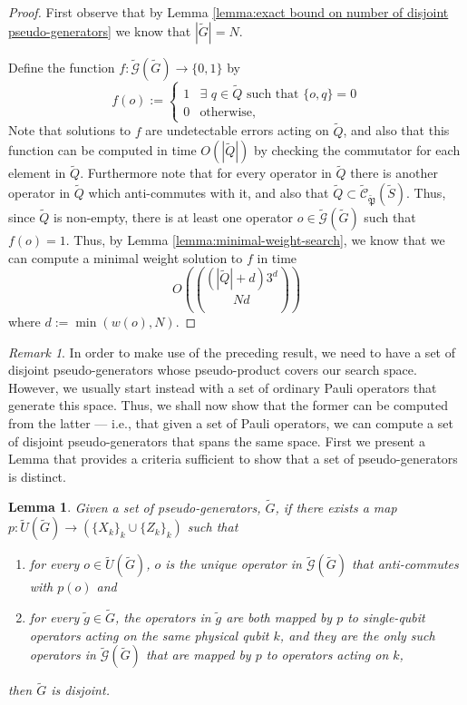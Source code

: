\documentclass[12pt]{amsbook}
\theoremstyle{plain}
\newtheorem{lemma}{Lemma}
\theoremstyle{definition}
\theoremstyle{remark}
\newtheorem{remark}{Remark}
\newcommand{\set}{\tilde}
\newcommand{\genfun}{\tilde{\mathcal{G}}}
\newcommand{\pauligroup}{{\set{\mathfrak{P}}}}
\newcommand{\centralizer}{\set{\mathcal{C}}}
\newcommand{\paren}[1]{\left(#1\right)}
\begin{document}
\begin{proof}
First observe that by Lemma \ref{lemma:exact bound on number of disjoint pseudo-generators} we know that $|\set G|=N$.

Define the function $f:\genfun(\set G)\to\{0,1\}$ by
$$f(o):=
\begin{cases}
1 & \exists\,\, q\in\set Q \,\,\text{such that}\,\, \{o,q\}=0\\
0 & \text{otherwise},
\end{cases}
$$
Note that solutions to $f$ are undetectable errors acting on $\set Q$, and also that this function can be computed in time $O(|\set Q|)$ by checking the commutator for each element in $\set Q$.  Furthermore note that for every operator in $\set Q$ there is another operator in $\set Q$ which anti-commutes with it, and also that $\set Q\subset \centralizer_\pauligroup(\set S)$.  Thus, since $\set Q$ is non-empty, there is at least one operator $o\in\genfun(\set G)$ such that $f(o)=1$.  Thus, by Lemma \ref{lemma:minimal-weight-search}, we know that we can compute a minimal weight solution to $f$ in time $$O\paren{(|\set Q|+d)3^d\choose{N}{d}}$$ where $d:=\min\paren{w(o),N}$.
\end{proof}
\begin{remark}
In order to make use of the preceding result, we need to have a set of disjoint pseudo-generators whose pseudo-product covers our search space.  However, we usually start instead with a set of ordinary Pauli operators that generate this space.  Thus, we shall now show that the former can be computed from the latter --- i.e., that given a set of Pauli operators, we can compute a set of disjoint pseudo-generators that spans the same space.  First we present a Lemma that provides a criteria sufficient to show that a set of pseudo-generators is distinct.
\end{remark}

\begin{lemma}
\label{lemma:disjointness-equvalence}
Given a set of pseudo-generators, $\set G$, if there exists a map $p:\set U(\set G)\to \paren{\{X_k\}_k \cup \{Z_k\}_k}$ such that
\begin{enumerate}
\item for every $o\in\set U(\set G)$, $o$ is the unique operator in $\genfun(\set G)$ that anti-commutes with $p(o)$ and
\item for every $\set g\in\set G$, the operators in $\set g$ are both mapped by $p$ to single-qubit operators acting on the same physical qubit $k$, and they are the only such operators in $\genfun(\set G)$ that are mapped by $p$ to operators acting on $k$,
\end{enumerate}
then $\set G$ is disjoint.
\end{lemma}
\end{document}
